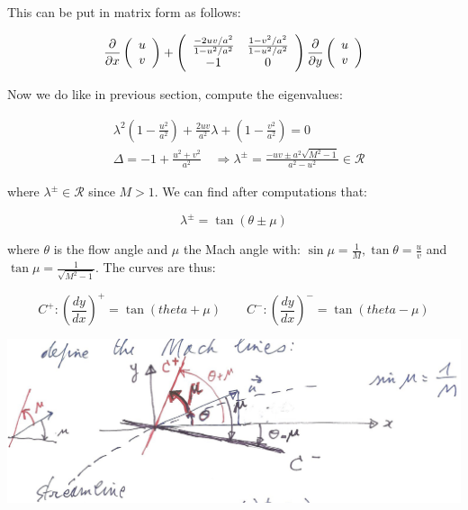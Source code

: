 	This can be put in matrix form as follows: 
	
	\begin{equation}
	\frac{\D}{\D x} 
	\left( 
	\begin{array}{c}
	u\\
	v
	\end{array}
	\right)
	+ 
		\left( 
	\begin{array}{ccc}
	\frac{-2uv/a^2}{1-u^2/a^2} & \frac{1-v^2/a^2}{1-u^2/a^2}\\
	-1 & 0
	\end{array}
	\right)
		\frac{\D}{\D y} 
	\left( 
	\begin{array}{c}
	u\\
	v
	\end{array}
	\right)
	\end{equation}
	
	Now we do like in previous section, compute the eigenvalues:
	
	\begin{equation}
	\begin{aligned}
	&\lambda ^2 \left( 1-\frac{u^2}{a^2} \right) + \frac{2 uv}{a^2}\lambda + \left(1-\frac{v^2}{a^2} \right) = 0\\
	&\Delta = - 1 + \frac{u^2 + v^2}{a^2} \quad \Rightarrow \lambda ^\pm = \frac{-uv\pm a^2 \sqrt{M^2 - 1}}{a^2 - u^2} \in \mathcal{R}
	\end{aligned}
\end{equation}	 

	where $\lambda^\pm \in \mathcal{R}$ since $M>1$. We can find after computations that: 
	
	\begin{equation}
	\lambda ^\pm = \tan (\theta \pm \mu )
	\end{equation}
	
	where $\theta$  is the flow angle and $\mu $ the Mach angle with: $\sin \mu = \frac{1}{M}, \tan \theta = \frac{u}{v}$  and $\tan \mu = \frac{1}{\sqrt{M^2-1}}$.  The curves are thus: 
	
	\begin{equation}
	C^+: \left(\frac{dy}{dx}\right)^+ = \tan (theta + \mu) \qquad C^-: \left(\frac{dy}{dx}\right) ^- = \tan (theta - \mu )
	\end{equation}
	
	\begin{center}
	\includegraphics[scale=0.2]{ch8/18}
	\end{center}
	
